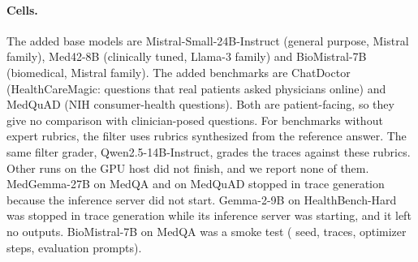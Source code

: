 \documentclass{article}
\newcommand{\hbhard}{HealthBench-Hard}
\begin{document}
\paragraph{Cells.} The added base models are Mistral-Small-24B-Instruct (general purpose, Mistral
family), Med42-8B (clinically tuned, Llama-3 family) and BioMistral-7B (biomedical, Mistral family).
The added benchmarks are ChatDoctor (HealthCareMagic: questions that real patients asked physicians
online) and MedQuAD (NIH consumer-health questions). Both are patient-facing, so they give no
comparison with clinician-posed questions. For benchmarks without expert rubrics, the filter uses
rubrics synthesized from the reference answer. The same filter grader, Qwen2.5-14B-Instruct,
grades the traces against these rubrics. Other runs on the GPU host did not finish, and we report
none of them. MedGemma-27B on MedQA and on MedQuAD stopped in trace generation because the
inference server did not start. Gemma-2-9B on \hbhard{} was stopped in trace generation while its
inference server was starting, and it left no outputs. BioMistral-7B on MedQA was a smoke test
(\statMedQAPreBioMistralJulSeeds{} seed, \statMedQAPreBioMistralJulFilterRaw{} traces,
\statMedQAPreBioMistralJulSteps{} optimizer steps, \statMedQAPreBioMistralJulPrompts{} evaluation
prompts).
\end{document}
